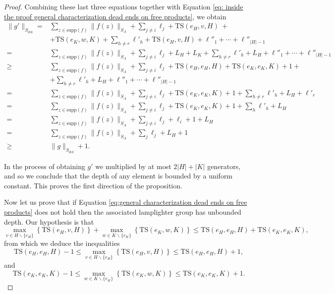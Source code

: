 \documentclass[reqno,oneside]{amsart}
\newcommand{\supp}[1]{\mathrm{supp}(#1)}
\newcommand{\std}{S_{\mathrm{std}}}
\newcommand{\TS}[3]{\mathrm{TS}\left(#1,#2,#3\right)}
\theoremstyle{plain}
\theoremstyle{definition}
\begin{document}
\begin{proof}
	
	Combining these last three equations together with Equation \eqref{eq: inside the proof general characterization dead ends on free products}, we obtain
	\begin{align*}
	\|g'\|_{\std}=&\sum_{z\in \supp{f}}\|f(z)\|_{S_A}+ \sum_{j\neq i}\ell_j +\TS{e_H}{v}{H}\ + \\ &+\TS{e_K}{w}{K}+\sum_{h\neq r}\ell'_h+\TS{e_H}{v}{H}+\ell''_1+\cdots+\ell''_{|H|-1}\\
	=& \sum_{z\in \supp{f}}\|f(z)\|_{S_A}+ \sum_{j\neq i}\ell_j +L_H +L_K+\sum_{h\neq r}\ell'_h+L_H+\ell''_1+\cdots+\ell''_{|H|-1}\\
	\ge & \sum_{z\in \supp{f}}\|f(z)\|_{S_A}+ \sum_{j\neq i}\ell_j +\TS{e_H}{e_H}{H}+\TS{e_K}{e_K}{K}+1+\ \\ &+\sum_{h\neq r}\ell'_h+L_H+\ell''_1+\cdots+\ell''_{|H|-1}\\
	= & \sum_{z\in \supp{f}}\|f(z)\|_{S_A}+ \sum_{j\neq i}\ell_j +\TS{e_K}{e_K}{K}+1+\sum_{h\neq r}\ell'_h+L_H+\ell'_r\\
	= & \sum_{z\in \supp{f}}\|f(z)\|_{S_A}+ \sum_{j\neq i}\ell_j +\TS{e_K}{e_K}{K}+1+\sum_{h}\ell'_h+L_H\\
	= & \sum_{z\in \supp{f}}\|f(z)\|_{S_A}+ \sum_{j\neq i}\ell_j+\ell_i+1+L_H\\
	= & \sum_{z\in \supp{f}}\|f(z)\|_{S_A}+ \sum_{j}\ell_j+L_H+1\\
	\ge & \|g\|_{\std}+1.
	\end{align*}
	
	In the process of obtaining $g'$ we multiplied by at most $2|H|+|K|$ generators, and so we conclude that the depth of any element is bounded by a uniform constant. This proves the first direction of the proposition.
	
	
	
	
	Now let us prove that if Equation \eqref{eq:general characterization dead ends on free products} does not hold then the associated lamplighter group has unbounded depth. Our hypothesis is that	
	\begin{equation}\label{eq: second inside proof general characterizatiom dead ends on free products}
	\max_{v\in H\backslash\{e_H\}}\left\{\TS{e_H}{v}{H}\right\}+\max_{w\in K\backslash\{e_K\}}\left\{\TS{e_K}{w}{K}\right\}\le \TS{e_H}{e_H}{H}+\TS{e_K}{e_K}{K},
	\end{equation} 
	from which we deduce the inequalities
	$$
	\TS{e_H}{e_H}{H}-1\le \max_{v\in H\backslash\{e_H\}}\left\{\TS{e_H}{v}{H}\right\}\le \TS{e_H}{e_H}{H}+1,
	$$
	and 
	$$
	\TS{e_K}{e_K}{K}-1\le \max_{w\in K\backslash\{e_K\}}\left\{\TS{e_K}{w}{K}\right\}\le \TS{e_K}{e_K}{K}+1.
	$$
	

\end{proof}
\end{document}

